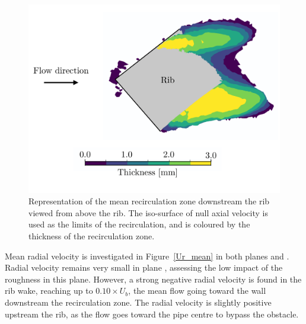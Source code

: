 \begin{figure}[!h]
\centering
\includegraphics[width=\linewidth]{fig/applications/optim/Recircul.pdf}
\caption{Representation of the mean recirculation zone downstream the rib viewed from above the rib. The iso-surface of null axial velocity is used as the limits of the recirculation, and is coloured by the thickness of the recirculation zone.}
\label{recircul}
\end{figure}

Mean radial velocity is investigated in Figure~\ref{Ur_mean} in both planes  and . Radial velocity remains very small in plane , assessing the low impact of the roughness in this plane. However, a strong negative radial velocity is found in the rib wake, reaching up to $0.10 \times U_b$, the mean flow going toward the wall downstream the recirculation zone. The radial velocity is slightly positive upstream the rib, as the flow goes toward the pipe centre to bypass the obstacle.\\

